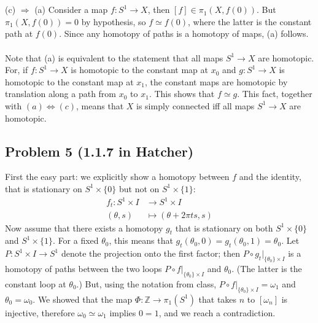\documentclass[12 pt]{article}
\newcommand{\Z}{\mathbb{Z}}
\begin{document}
\\
\\
(c) $\Rightarrow$ (a) Consider a map $f : S^1 \to X$, then $[f] \in \pi_1 (X, f(0))$. But $\pi_1(X, f(0)) = 0$ by hypothesis, so $f\simeq f(0)$, where the latter is the constant path at $f(0)$. Since any homotopy of paths is a homotopy of maps, (a) follows.
\\
\\
Note that (a) is equivalent to the statement that all maps $S^1 \to X$ are homotopic. For, if $f:S^1 \to X$ is homotopic to the constant map at $x_0$ and $g:S^1 \to X$ is homotopic to the constant map at $x_1$, the constant maps are homotopic by translation along a path from $x_0$ to $x_1$. This shows that $f \simeq g$. This fact, together with $(a) \Leftrightarrow (c)$, means that $X$ is simply connected iff all maps $S^1 \to X$ are homotopic.



\subsection*{Problem 5 (1.1.7 in Hatcher)}
First the easy part: we explicitly show a homotopy between $f$ and the identity, that is stationary on $S^1 \times \{0\}$ but not on $S^1 \times \{1\}$:
\begin{align*}
f_t : S^1 \times I &\to S^1 \times I \\
(\theta , s) &\mapsto (\theta + 2\pi t s, s)
\end{align*}
Now assume that there exists a homotopy $g_t$ that is stationary on both $S^1 \times \{0\}$ and $S^1 \times \{1\}$. For a fixed $\theta_0$, this means that $g_t (\theta_0, 0) = g_t(\theta_0, 1) = \theta_0$. Let $P : S^1 \times I \to S^1$ denote the projection onto the first factor; then $P \circ g_t|_{\{\theta_0\}\times I}$ is a homotopy of paths between the two loops $P \circ f|_{\{\theta_0\}\times I}$ and $\theta_0$. (The latter is the constant loop at $\theta_0$.) But, using the notation from class, $P \circ f|_{\{\theta_0\}\times I} = \omega_1$ and $\theta_0 = \omega_0$. We showed that the map $\Phi : \Z \to \pi_1(S^1)$ that takes $n$ to $[\omega_n]$ is injective, therefore $\omega_0 \simeq \omega_1$ implies $0 = 1$, and we reach a contradiction.
\end{document}
